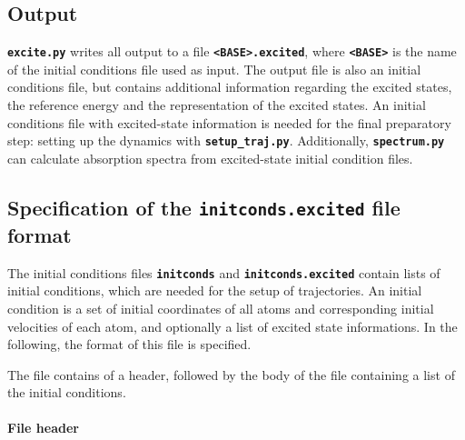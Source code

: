 \documentclass[a4paper,10pt,DIV=15,openany,twoside=false]{scrbook}
\newcommand{\ttt}[1]{\textbf{\texttt{#1}}}
\begin{document}
\subsection{Output}

\ttt{excite.py} writes all output to a file \ttt{<BASE>.excited}, where \ttt{<BASE>} is the name of the initial conditions file used as input. The output file is also an initial conditions file, but contains additional information regarding the excited states, the reference energy and the representation of the excited states. An initial conditions file with excited-state information is needed for the final preparatory step: setting up the dynamics with \ttt{setup\_traj.py}.
Additionally, \ttt{spectrum.py} can calculate absorption spectra from excited-state initial condition files.

\subsection{Specification of the \ttt{initconds.excited} file format}\label{sec:initcondsfile}

The initial conditions files \ttt{initconds} and \ttt{initconds.excited} contain lists of initial conditions, which are needed for the setup of trajectories. An initial condition is a set of initial coordinates of all atoms and corresponding initial velocities of each atom, and optionally a list of excited state informations. In the following, the format of this file is specified.

The file contains of a header, followed by the body of the file containing a list of the initial conditions. 

\paragraph{File header}
\end{document}
